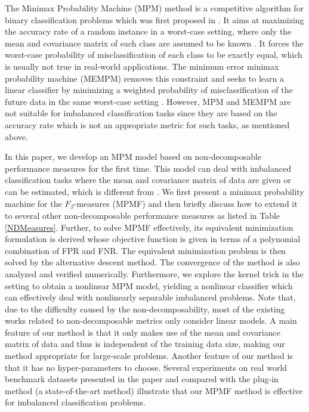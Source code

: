 \documentclass[15pt]{article}
\begin{document}
The Minimax Probability Machine (MPM) method is a competitive algorithm for binary classification problems
which was first proposed in \cite{Lanckriet2002}.
It aims at maximizing the accuracy rate of a random instance in a worst-case setting,
where only the mean and covariance matrix of each class are assumed to be known \cite{Lanckriet2002}.
It forces the worst-case probability of misclassification of each class to be exactly equal,
which is usually not true in real-world applications.
The minimum error minimax probability machine (MEMPM) removes this constraint and seeks to learn
a linear classifier by minimizing a weighted probability of misclassification of the future data
in the same worst-case setting \cite{Huang2004}. 
However, MPM and MEMPM are not suitable for imbalanced classification tasks since they are based on 
the accuracy rate which is not an appropriate metric for such tasks, as mentioned above.

In this paper, we develop an MPM model based on non-decomposable performance measures for the first time. 
This model can deal with imbalanced classification tasks where the mean and covariance
matrix of data are given or can be estimated, which is different from \cite{Lanckriet2002,Huang2004}.
We first present a minimax probability machine for the $F_\beta$-measures (MPMF) and then briefly discuss 
how to extend it to several other non-decomposable performance measures as listed in Table \ref{NDMeasures}.
Further, to solve MPMF effectively, its equivalent minimization formulation is derived 
whose objective function is given in terms of a polynomial combination of FPR and FNR.
The equivalent minimization problem is then solved by the alternative descent method.
The convergence of the method is also analyzed and verified numerically.
Furthermore, we explore the kernel trick in the setting to obtain a nonlinear MPM model, yielding 
a nonlinear classifier which can effectively deal with nonlinearly separable imbalanced problems.
Note that, due to the difficulty caused by the non-decomposability, most of the existing works related to 
non-decomposable metrics only consider linear models.
A main feature of our method is that it only makes use of the mean and covariance matrix of data and thus 
is independent of the training data size, making our method appropriate for large-scale problems.
Another feature of our method is that it has no hyper-parameters to choose.
Several experiments on real world benchmark datasets presented in the paper and compared with the plug-in
method (a state-of-the-art method) illustrate that our MPMF method is effective for imbalanced classification 
problems. 
\end{document}
